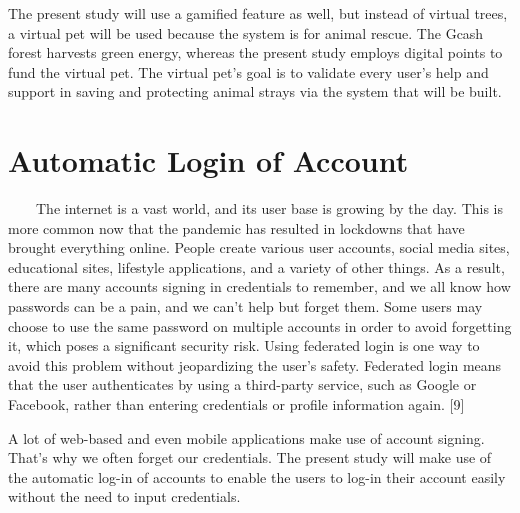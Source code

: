 The present study will use a gamified feature as well, but instead of virtual trees, a virtual pet will be used because the system is for animal rescue. The Gcash forest harvests green energy, whereas the present study employs digital points to fund the virtual pet. The virtual pet's goal is to validate every user's help and support in saving and protecting animal strays via the system that will be built.


\section{Automatic Login of Account}

~~~~The internet is a vast world, and its user base is growing by the day. This is more common now that the pandemic has resulted in lockdowns that have brought everything online. People create various user accounts, social media sites, educational sites, lifestyle applications, and a variety of other things. As a result, there are many accounts signing in credentials to remember, and we all know how passwords can be a pain, and we can't help but forget them. Some users may choose to use the same password on multiple accounts in order to avoid forgetting it, which poses a significant security risk. Using federated login is one way to avoid this problem without jeopardizing the user's safety. Federated login means that the user authenticates by using a third-party service, such as Google or Facebook, rather than entering credentials or profile information again. [9]

A lot of web-based and even mobile applications make use of account signing. That's why we often forget our credentials. The present study will make use of the automatic log-in of accounts to enable the users to log-in their account easily without the need to input credentials. 












